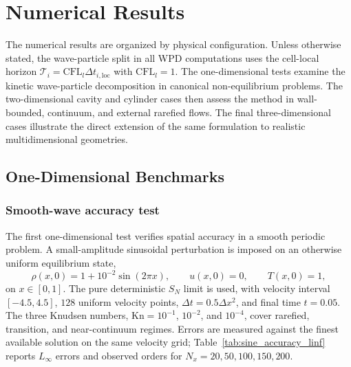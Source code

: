 \documentclass[preprint,12pt]{elsarticle}
\begin{document}
\section{Numerical Results}\label{sec:results}


The numerical results are organized by physical configuration. Unless otherwise stated, the wave-particle split in all WPD computations uses the cell-local horizon \(\mathcal{T}_i=\mathrm{CFL}_l\Delta t_{i,\mathrm{loc}}\) with \(\mathrm{CFL}_l=1\). The one-dimensional tests examine the kinetic wave-particle decomposition in canonical non-equilibrium problems. The two-dimensional cavity and cylinder cases then assess the method in wall-bounded, continuum, and external rarefied flows. The final three-dimensional cases illustrate the direct extension of the same formulation to realistic multidimensional geometries.

\subsection{One-Dimensional Benchmarks}

\subsubsection{Smooth-wave accuracy test}

The first one-dimensional test verifies spatial accuracy in a smooth periodic problem. A small-amplitude sinusoidal perturbation is imposed on an otherwise uniform equilibrium state,
\[
\rho(x,0)=1+10^{-2}\sin(2\pi x),\qquad u(x,0)=0,\qquad T(x,0)=1,
\]
on \(x\in[0,1]\). The pure deterministic \(S_N\) limit is used, with velocity interval \([-4.5,4.5]\), \(128\) uniform velocity points, \(\Delta t=0.5\Delta x^2\), and final time \(t=0.05\). The three Knudsen numbers, \(\mathrm{Kn}=10^{-1}\), \(10^{-2}\), and \(10^{-4}\), cover rarefied, transition, and near-continuum regimes. Errors are measured against the finest available solution on the same velocity grid; Table~\ref{tab:sine_accuracy_linf} reports \(L_\infty\) errors and observed orders for \(N_x=20,50,100,150,200\).
\end{document}
